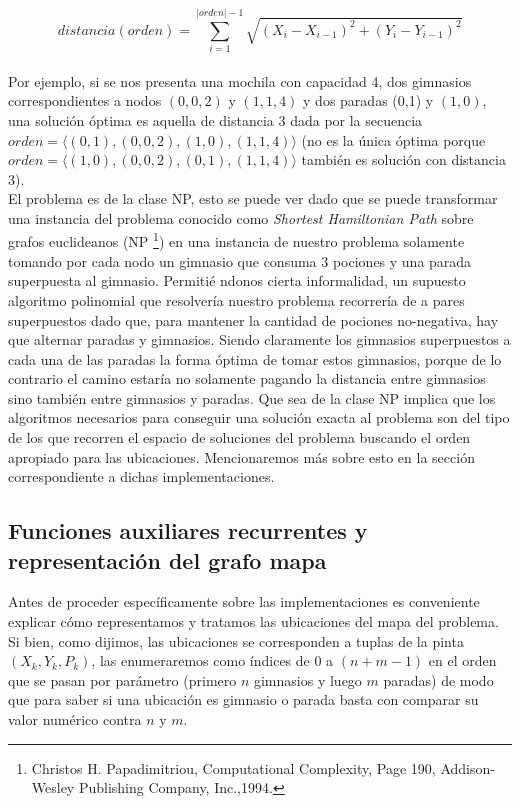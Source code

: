    $$ distancia(orden) = \sum_{i=1}^{|orden|-1} \sqrt{(X_i - X_{i-1})^2 + (Y_i - Y_{i-1})^2} $$
   \\

   Por ejemplo, si se nos presenta una mochila con capacidad 4, dos gimnasios correspondientes a nodos $(0,0,2)$ y $(1,1,4)$ y dos paradas (0,1) y $(1,0)$, una solución óptima es aquella de distancia 3 dada por la secuencia $orden =\langle {(0,1), (0,0,2), (1,0), (1,1,4)} \rangle$ (no es la única óptima porque $orden = \langle {(1,0), (0,0,2), (0,1), (1,1,4)} \rangle$ también es solución con distancia 3).
   \\

   El problema es de la clase NP, esto se puede ver dado que se puede transformar una instancia del problema conocido como \emph{Shortest Hamiltonian Path} sobre grafos euclideanos (NP \footnote{Christos H. Papadimitriou, Computational Complexity, Page 190, Addison-Wesley Publishing Company, Inc.,1994.}) en una instancia de nuestro problema solamente tomando por cada nodo un gimnasio que consuma 3 pociones y una parada superpuesta al gimnasio. Permitié ndonos cierta informalidad, un supuesto algoritmo polinomial que resolvería nuestro problema recorrería de a pares superpuestos dado que, para mantener la cantidad de pociones no-negativa, hay que alternar paradas y gimnasios. Siendo claramente los gimnasios superpuestos a cada una de las paradas la forma óptima de tomar estos gimnasios, porque de lo contrario el camino estaría no solamente pagando la distancia entre gimnasios sino también entre gimnasios y paradas. Que sea de la clase NP implica que los algoritmos necesarios para conseguir una solución exacta al problema son del tipo de los que recorren el espacio de soluciones del problema buscando el orden apropiado para las ubicaciones. Mencionaremos más sobre esto en la sección correspondiente a dichas implementaciones.

   \subsection{Funciones auxiliares recurrentes y representación del grafo mapa}

   Antes de proceder específicamente sobre las implementaciones es conveniente explicar cómo representamos y tratamos las ubicaciones del mapa del problema. Si bien, como dijimos, las ubicaciones se corresponden a tuplas de la pinta $(X_k, Y_k, P_k)$, las enumeraremos como índices de 0 a $(n + m - 1)$ en el orden que se pasan por parámetro (primero $n$ gimnasios y luego $m$ paradas) de modo que para saber si una ubicación es gimnasio o parada basta con comparar su valor numérico contra $n$ y $m$.
   \\

